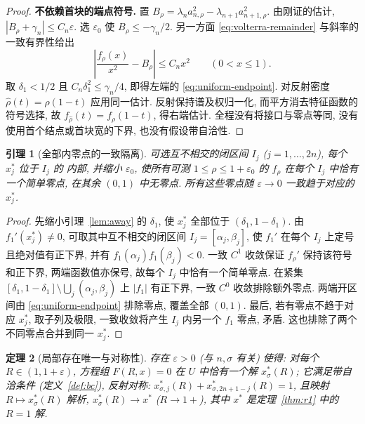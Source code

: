 \documentclass[UTF8]{ctexart}
\newtheorem{theorem}{定理}[section]
\newtheorem{lemma}[theorem]{引理}
\begin{document}
\begin{proof}
\textbf{不依赖首块的端点符号.} 置
$B_\rho=\lambda_n a_{n,\rho}^2-\lambda_{n+1}a_{n+1,\rho}^2$.
由刚证的估计, $|B_\rho+\gamma_n|\le C_n\varepsilon$.
选 $\varepsilon_0$ 使 $B_\rho\le-\gamma_n/2$.
另一方面 \eqref{eq:volterra-remainder} 与斜率的一致有界性给出
\begin{equation*}
\left|\frac{f_\rho(x)}{x^2}-B_\rho\right|\le C_n x^2\qquad(0<x\le1).
\end{equation*}
取 $\delta_1<1/2$ 且 $C_n\delta_1^2\le\gamma_n/4$, 即得左端的
\eqref{eq:uniform-endpoint}. 对反射密度 $\widehat\rho(t)=\rho(1-t)$ 应用同一估计.
反射保持谱及权归一化, 而平方消去特征函数的符号选择, 故
$f_{\widehat\rho}(t)=f_\rho(1-t)$, 得右端估计. 全程没有将接口与零点等同,
没有使用首个结点或首块宽的下界, 也没有假设带自洽性.
\end{proof}

\begin{lemma}[全部内零点的一致隔离]\label{lem:isol}
可选互不相交的闭区间 $I_j$ ($j=1,\dots,2n$), 每个 $x_j^*$ 位于 $I_j$ 的
内部, 并缩小 $\varepsilon_0$, 使所有可测 $1\le\rho\le1+\varepsilon_0$ 的
$f_\rho$ 在每个 $I_j$ 中恰有一个简单零点, 在其余 $(0,1)$ 中无零点.
所有这些零点随 $\varepsilon\to0$ 一致趋于对应的 $x_j^*$.
\end{lemma}
\begin{proof}
先缩小引理~\ref{lem:away} 的 $\delta_1$, 使 $x_j^*$ 全部位于
$(\delta_1,1-\delta_1)$. 由 $f_1'(x_j^*)\ne0$, 可取其中互不相交的闭区间
$I_j=[\alpha_j,\beta_j]$, 使 $f_1'$ 在每个 $I_j$ 上定号且绝对值有正下界,
并有 $f_1(\alpha_j)f_1(\beta_j)<0$.
一致 $C^1$ 收敛保证 $f_\rho'$ 保持该符号和正下界, 两端函数值亦保号,
故每个 $I_j$ 中恰有一个简单零点.
在紧集
$[\delta_1,1-\delta_1]\setminus\bigcup_j(\alpha_j,\beta_j)$ 上
$|f_1|$ 有正下界, 一致 $C^0$ 收敛排除额外零点.
两端开区间由 \eqref{eq:uniform-endpoint} 排除零点, 覆盖全部 $(0,1)$.
最后, 若有零点不趋于对应 $x_j^*$, 取子列及极限, 一致收敛将产生
$I_j$ 内另一个 $f_1$ 零点, 矛盾. 这也排除了两个不同零点合并到同一 $x_j^*$.
\end{proof}

\begin{theorem}[局部存在唯一与对称性]\label{thm:local}
存在 $\varepsilon>0$ (与 $n,\sigma$ 有关) 使得: 对每个 $R\in(1,1+\varepsilon)$,
方程组 $F(R,x)=0$ 在 $U$ 中恰有一个解 $x_\sigma^*(R)$; 它满足带自洽条件
(定义~\ref{def:bc}), 反射对称:
$x_{\sigma,j}^*(R)+x_{\sigma,2n+1-j}^*(R)=1$, 且映射
$R\mapsto x_\sigma^*(R)$ 解析, $x_\sigma^*(R)\to x^*$ ($R\to1+$),
其中 $x^*$ 是定理~\ref{thm:r1} 中的 $R=1$ 解.
\end{theorem}
\end{document}
